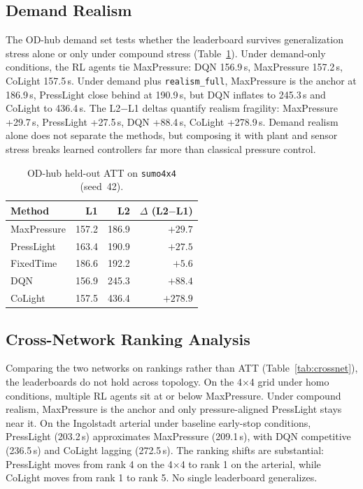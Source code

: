 \documentclass[conference]{IEEEtran}
\newcommand{\realismfull}{\texttt{realism\_full}}
\begin{document}
\subsection{Demand Realism}

The OD-hub demand set tests whether the leaderboard survives generalization stress alone or only under compound stress (Table~\ref{tab:odh4x4}). Under demand-only conditions, the RL agents tie MaxPressure: DQN 156.9\,s, MaxPressure 157.2\,s, CoLight 157.5\,s. Under demand plus \realismfull, MaxPressure is the anchor at 186.9\,s, PressLight close behind at 190.9\,s, but DQN inflates to 245.3\,s and CoLight to 436.4\,s. The L2$-$L1 deltas quantify realism fragility: MaxPressure +29.7\,s, PressLight +27.5\,s, DQN +88.4\,s, CoLight +278.9\,s. Demand realism alone does not separate the methods, but composing it with plant and sensor stress breaks learned controllers far more than classical pressure control.

\begin{table}[t]
\centering
\caption{OD-hub held-out ATT on \texttt{sumo4x4} (seed~42).}
\label{tab:odh4x4}
\begin{tabular}{lrrr}
\toprule
Method & L1 & L2 & $\Delta$ (L2$-$L1) \\
\midrule
MaxPressure & 157.2 & 186.9 & $+29.7$ \\
PressLight  & 163.4 & 190.9 & $+27.5$ \\
FixedTime   & 186.6 & 192.2 & $+5.6$ \\
DQN         & 156.9 & 245.3 & $+88.4$ \\
CoLight     & 157.5 & 436.4 & $+278.9$ \\
\bottomrule
\end{tabular}
\end{table}

\subsection{Cross-Network Ranking Analysis}

Comparing the two networks on rankings rather than ATT (Table~\ref{tab:crossnet}), the leaderboards do not hold across topology. On the 4$\times$4 grid under homo conditions, multiple RL agents sit at or below MaxPressure. Under compound realism, MaxPressure is the anchor and only pressure-aligned PressLight stays near it. On the Ingolstadt arterial under baseline early-stop conditions, PressLight (203.2\,s) approximates MaxPressure (209.1\,s), with DQN competitive (236.5\,s) and CoLight lagging (272.5\,s). The ranking shifts are substantial: PressLight moves from rank 4 on the 4$\times$4 to rank 1 on the arterial, while CoLight moves from rank 1 to rank 5. No single leaderboard generalizes.
\end{document}
